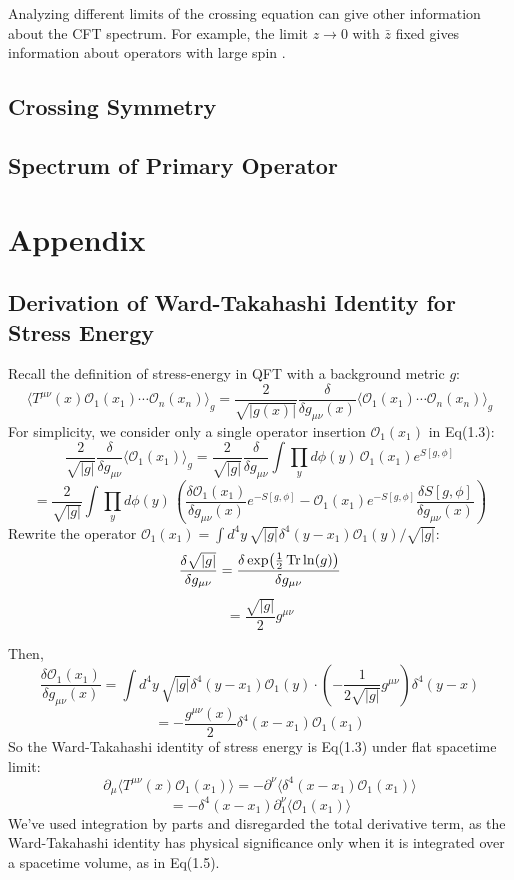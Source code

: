 \documentclass[12pt]{article}
\numberwithin{equation}{section}
\newcommand\<\langle
\renewcommand\>\rangle
\renewcommand\.{\cdot}
\begin{document}
Analyzing different limits of the crossing equation can give other information about the CFT spectrum.  For example, the limit $z\to 0$ with $\bar z$ fixed gives information about operators with large spin \cite{Alday:2007mf,Fitzpatrick:2012yx,Komargodski:2012ek,Alday:2015ewa}.

\subsection{Crossing Symmetry}
\subsection{Spectrum of Primary Operator}
\section*{Appendix}
\subsection*{Derivation of Ward-Takahashi Identity for Stress Energy}
Recall the definition of stress-energy in QFT with a background metric $g$:
\begin{equation*}
    \langle T^{\mu\nu}(x)\mathcal{O}_1(x_1)\cdots\mathcal{O}_n(x_n)\rangle_g = \frac{2}{\sqrt{|g(x)|}}\frac{\delta}{\delta g_{\mu\nu}(x)}\langle\mathcal{O}_1(x_1)\cdots\mathcal{O}_n(x_n)\rangle_{g}
\end{equation*}
For simplicity, we consider only a single operator insertion $\mathcal{O}_1(x_1)$ in Eq(1.3):
\[
    \frac{2}{\sqrt{|g|}}\frac{\delta}{\delta g_{\mu\nu}}\langle\mathcal{O}_1(x_1)\rangle_g = \frac{2}{\sqrt{|g|}}\frac{\delta}{\delta g_{\mu\nu}}\int{\prod_{y}d\phi(y)\,}\mathcal{O}_1(x_1)e^{S[g,\phi]}
\]
\[
    = \frac{2}{\sqrt{|g|}}\int{\prod_{y}d\phi(y)\,}\left(\frac{\delta\mathcal{O}_1(x_1)}{\delta g_{\mu\nu}(x)}e^{-S[g,\phi]} - \mathcal{O}_1(x_1)e^{-S[g,\phi]}\frac{\delta S[g,\phi]}{\delta g_{\mu\nu}(x)}\right)
\]
Rewrite the operator $\mathcal{O}_1(x_1) = \int{d^4y\,} \sqrt{|g|}\delta^4(y-x_1)\mathcal{O}_1(y)/\sqrt{|g|}$:
\[
    \frac{\delta\sqrt{|g|}}{\delta g_{\mu\nu}} = \frac{\delta\exp(\frac{1}{2}\Tr\ln(g))}{\delta g_{\mu\nu}}
\]
\[
    =\frac{\sqrt{|g|}}{2}g^{\mu\nu}
\]

Then,
\[
    \frac{\delta\mathcal{O}_1(x_1)}{\delta g_{\mu\nu}(x)} = \int{d^4y\,\sqrt{|g|}}\delta^4(y-x_1)\mathcal{O}_1(y)\cdot(-\frac{1}{2\sqrt{|g|}}g^{\mu\nu})\delta^4(y-x)
\]
\[
    = -\frac{g^{\mu\nu}(x)}{2}\delta^4(x-x_1)\mathcal{O}_1(x_1)
\]
So the Ward-Takahashi identity of stress energy is Eq(1.3) under flat spacetime limit:
\[
     \partial_{\mu}\langle T^{\mu\nu}(x)\mathcal{O}_1(x_1)\rangle = -\partial^{\nu}\langle\delta^4(x-x_1)\mathcal{O}_1(x_1)\rangle
\]
\[
    = -\delta^4(x-x_1)\partial^{\nu}_{1}\langle\mathcal{O}_1(x_1)\rangle
\]
We've used integration by parts and disregarded the total derivative term, as the Ward-Takahashi identity has physical significance only when it is integrated over a spacetime volume, as in Eq(1.5).
\end{document}
